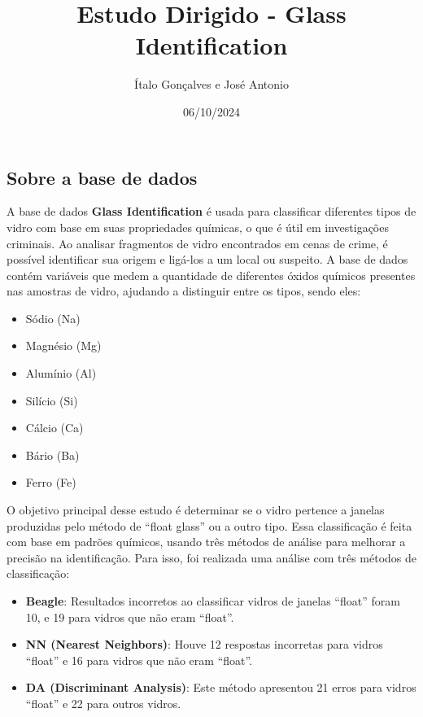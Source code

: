 \documentclass[
]{article}
\title{Estudo Dirigido - Glass Identification}
\author{Ítalo Gonçalves e José Antonio}
\date{06/10/2024}
\providecommand{\tightlist}{%
  \setlength{\itemsep}{0pt}\setlength{\parskip}{0pt}}
\begin{document}
\maketitle

\subsection{\texorpdfstring{Sobre a base de dados
}{Sobre a base de dados }}\label{sobre-a-base-de-dados}

A base de dados \textbf{Glass Identification} é usada para classificar
diferentes tipos de vidro com base em suas propriedades químicas, o que
é útil em investigações criminais. Ao analisar fragmentos de vidro
encontrados em cenas de crime, é possível identificar sua origem e
ligá-los a um local ou suspeito. A base de dados contém variáveis que
medem a quantidade de diferentes óxidos químicos presentes nas amostras
de vidro, ajudando a distinguir entre os tipos, sendo eles:

\begin{itemize}
\tightlist
\item
  Sódio (Na)
\item
  Magnésio (Mg)
\item
  Alumínio (Al)
\item
  Silício (Si)
\item
  Cálcio (Ca)
\item
  Bário (Ba)
\item
  Ferro (Fe)
\end{itemize}

O objetivo principal desse estudo é determinar se o vidro pertence a
janelas produzidas pelo método de ``float glass'' ou a outro tipo. Essa
classificação é feita com base em padrões químicos, usando três métodos
de análise para melhorar a precisão na identificação. Para isso, foi
realizada uma análise com três métodos de classificação:

\begin{itemize}
\tightlist
\item
  \textbf{Beagle}: Resultados incorretos ao classificar vidros de
  janelas ``float'' foram 10, e 19 para vidros que não eram ``float''.
\item
  \textbf{NN (Nearest Neighbors)}: Houve 12 respostas incorretas para
  vidros ``float'' e 16 para vidros que não eram ``float''.
\item
  \textbf{DA (Discriminant Analysis)}: Este método apresentou 21 erros
  para vidros ``float'' e 22 para outros vidros.
\end{itemize}
\end{document}
